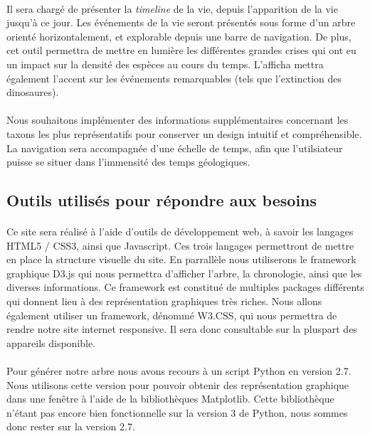 \documentclass[a4paper]{article}
\begin{document}
		\paragraph{}
		Il sera chargé de présenter la \emph{timeline} de la vie, depuis l'apparition de la vie jusqu'à ce jour. Les événements de la vie seront présentés sous forme d'un arbre orienté horizontalement, et explorable depuis une barre de navigation.	De plus, cet outil permettra de mettre en lumière les différentes grandes crises qui ont eu un impact sur la densité des espèces au cours du temps. L'afficha mettra également l'accent sur les événements remarquables (tels que l'extinction des dinosaures). 
		
		\paragraph{}
		Nous souhaitons implémenter des informations supplémentaires concernant les taxons les plus représentatifs pour conserver un design intuitif et compréhensible.
		La navigation sera accompagnée d'une échelle de temps, afin que l'utilsiateur puisse se situer dans l'immensité des temps géologiques.
				

	\subsection{Outils utilisés pour répondre aux besoins}
		\paragraph{}
		Ce site sera réalisé à l'aide d'outils de développement web, à savoir les langages HTML5 / CSS3, ainsi que Javascript. Ces trois langages permettront de mettre en place la structure visuelle du site.
		En parrallèle nous utiliserons le framework graphique D3.js qui nous permettra d'afficher l'arbre, la chronologie, ainsi que les diverses informations. Ce framework est constitué de multiples packages différents qui donnent lieu à des représentation graphiques très riches. Nous allons également utiliser un framework, dénommé W3.CSS, qui nous permettra de rendre notre site internet responsive. Il sera donc consultable sur la pluspart des appareils disponible.

		\paragraph{}
		Pour générer notre arbre nous avons recours à un script Python en version 2.7. Nous utilisons cette version pour pouvoir obtenir des représentation graphique dans une fenêtre à l'aide de la bibliothèques Matplotlib. Cette bibliothèque n'étant pas encore bien fonctionnelle sur la version 3 de Python, nous sommes donc rester sur la version 2.7.
	
\end{document}
